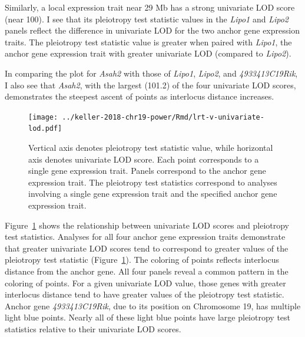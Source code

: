 \documentclass[oneside]{book}\usepackage[]{graphicx}\usepackage[]{color}
\begin{document}
Similarly, a local expression trait near 29 Mb has a strong univariate LOD score (near 100). 
I see that its pleiotropy test statistic values in the \emph{Lipo1} and \emph{Lipo2} panels reflect the difference in univariate LOD for the two anchor gene expression traits. 
The pleiotropy test statistic value is greater when 
paired with \emph{Lipo1}, the anchor gene expression trait with greater univariate LOD (compared to \emph{Lipo2}). 

In comparing the plot for \emph{Asah2} with those of \emph{Lipo1}, \emph{Lipo2}, and \emph{4933413C19Rik}, I also see that \emph{Asah2}, with the largest (101.2) of the four univariate LOD scores, demonstrates the steepest ascent of points as interlocus distance increases. 






\begin{figure}
    \centering
    \texttt{[image: ../keller-2018-chr19-power/Rmd/lrt-v-univariate-lod.pdf]}
    \caption[Pleiotropy LRT vs. univariate LOD score plots reveal that greater univariate LOD scores (and greater interlocus distance) tend to correspond to greater pleiotropy LRT values.]{Vertical axis denotes pleiotropy test statistic value, while horizontal axis denotes univariate LOD score. Each point corresponds to a single gene expression trait. Panels correspond to the anchor gene expression trait. The pleiotropy test statistics correspond to analyses involving a single gene expression trait and the specified anchor gene expression trait.}
    \label{fig:lod}
\end{figure}

Figure~\ref{fig:lod} shows the relationship between univariate LOD scores and pleiotropy test statistics. Analyses for all four anchor gene expression traits demonstrate that greater univariate LOD
scores tend to correspond to greater values of the pleiotropy test statistic (Figure~\ref{fig:lod}). 
The coloring of points reflects interlocus distance from the anchor gene. 
All four panels reveal a common pattern in the coloring of points.
For a given univariate LOD value, those genes with greater interlocus distance 
tend to have greater values of the pleiotropy test statistic. 
Anchor gene \emph{4933413C19Rik}, due to its position on Chromosome 19, has multiple light blue points. 
Nearly all of these light blue points have large pleiotropy test
statistics relative to their univariate LOD scores.
\end{document}
